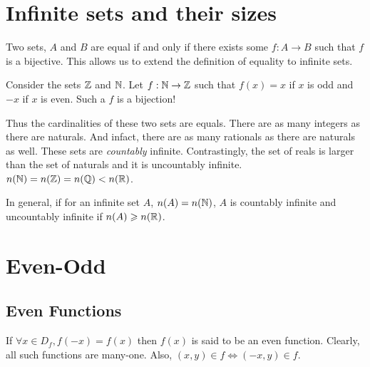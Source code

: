 \section{Infinite sets and their sizes}

\irrev

Two sets, \(A\) and \(B\) are equal if and only if there exists 
some \(f : A \to B\) such that \(f\) is a bijective. This allows us to extend the definition
of equality to infinite sets.

Consider the sets \(\mathbb Z\) and \(\mathbb N\). Let \(f : \mathbb N \to \mathbb Z\) such that 
\(f(x) = x\) if \(x\) is odd and \(-x\) if \(x\) is even. Such a \(f\) is a bijection!

Thus the cardinalities of these two sets are equals. There are as many integers as there are
naturals. And infact, there are as many rationals as there are naturals as well.  
These sets are \emph{countably} infinite. Contrastingly, the set of reals is larger
than the set of naturals and it is uncountably infinite. \(n(\mathbb N) = n(\mathbb Z) = n(\mathbb Q) < n(\mathbb R)\).

In general, if for an infinite set \(A\), \(n(A) = n(\mathbb N)\), \(A\) is countably infinite
and uncountably infinite if \(n(A) \geqslant n(\mathbb R)\). 

\section{Even-Odd}

\subsection{Even Functions}
\label{Function!odd}

If \(\forall x \in D_f, f(-x) = f(x)\) then \(f(x)\) is said to be an even function. 
Clearly, all such functions are many-one. Also, \((x,y) \in f \iff (-x,y) \in f\).

